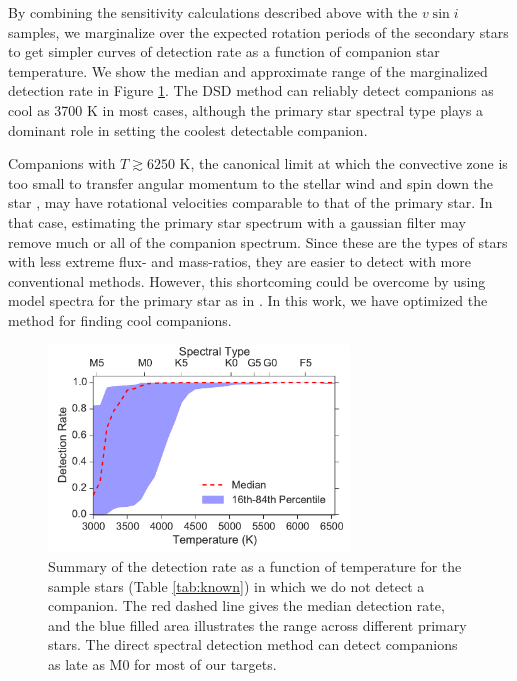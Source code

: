 \documentclass{emulateapj}
\begin{document}
By combining the sensitivity calculations described above with the $v\sin{i}$ samples, we marginalize over the expected rotation periods of the secondary stars to get simpler curves of detection rate as a function of companion star temperature. We show the median and approximate range of the marginalized detection rate in Figure \ref{fig:sensitivity}. The DSD method can reliably detect companions as cool as 3700 K in most cases, although the primary star spectral type plays a dominant role in setting the coolest detectable companion. 

Companions with $T \gtrsim 6250$ K, the canonical limit at which the convective zone is too small to transfer angular momentum to the stellar wind and spin down the star \citep{Pinsonneault2001}, may have rotational velocities comparable to that of the primary star. In that case, estimating the primary star spectrum with a gaussian filter may remove much or all of the companion spectrum. Since these are the types of stars with less extreme flux- and mass-ratios, they are easier to detect with more conventional methods. However, this shortcoming could be overcome by using model spectra for the primary star as in \citet{Kolbl2015}. In this work, we have optimized the method for finding cool companions.


\begin{figure}
        \centering
        \includegraphics[width=80mm]{DetectionRate.pdf}

         \caption{Summary of the detection rate as a function of temperature for the sample stars (Table \ref{tab:known}) in which we do not detect a companion. The red dashed line gives the median detection rate, and the blue filled area illustrates the range across different primary stars. The direct spectral detection method can detect companions as late as M0 for most of our targets.}
         \label{fig:sensitivity}
\end{figure}
\end{document}
